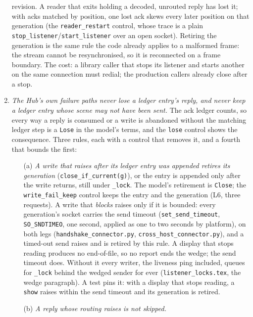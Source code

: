 \documentclass[a4paper,10pt,fleqn]{article}
\begin{document}
\begin{enumerate}
    revision.  A reader that exits holding a decoded, unrouted reply has lost
    it; with acks matched by position, one lost ack skews every later position
    on that generation (the \texttt{reader\_restart} control, whose trace is a
    plain \texttt{stop\_listener}/\texttt{start\_listener} over an open
    socket).  Retiring the generation is the same rule the code already
    applies to a malformed frame: the stream cannot be resynchronised, so it is
    reconnected on a frame boundary.  The cost: a library caller that stops its
    listener and starts another on the same connection must redial; the
    production callers already close after a stop.
  \item \emph{The Hub's own failure paths never lose a ledger entry's
    reply, and never keep a ledger entry whose scene may not have been sent.}
    The ack ledger counts, so every way a reply is consumed or a write is
    abandoned without the matching ledger step is a \texttt{Lose} in the
    model's terms, and the \texttt{lose} control shows the consequence.  Three
    rules, each with a control that removes it, and a fourth that bounds the
    first:
    \begin{enumerate}
      \item[(a)] \emph{A write that raises after its ledger entry was
        appended retires its generation} (\texttt{close\_if\_current(g)}), or
        the entry is appended only after the write returns, still under
        \texttt{\_lock}.  The model's retirement is \texttt{Close}; the
        \texttt{write\_fail\_keep} control keeps the entry and the
        generation (L6, three requests).  A write that \emph{blocks} raises
        only if it is bounded: every generation's socket carries the send
        timeout (\texttt{set\_send\_timeout}, \texttt{SO\_SNDTIMEO}, one
        second, applied as one to two seconds by platform), on both legs (\texttt{handshake\_connector.py},
        \texttt{cross\_host\_connector.py}), and a timed-out send raises and
        is retired by this rule.  A display that stops reading produces no
        end-of-file, so no report ends the wedge; the send timeout does.
        Without it every writer, the liveness ping included, queues for
        \texttt{\_lock} behind the wedged sender for ever
        (\texttt{listener\_locks.tex}, the wedge paragraph).  A test pins it:
        with a display that stops reading, a \texttt{show} raises within the
        send timeout and its generation is retired.
      \item[(b)] \emph{A reply whose routing raises is not skipped.}

\end{enumerate}
\end{enumerate}
\end{document}
